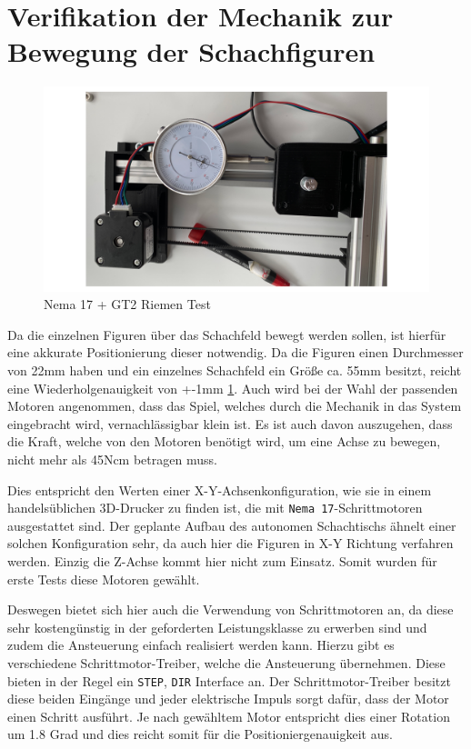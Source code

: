 \hypertarget{verifikation-der-mechanik-zur-bewegung-der-schachfiguren}{%
\section{Verifikation der Mechanik zur Bewegung der
Schachfiguren}\label{verifikation-der-mechanik-zur-bewegung-der-schachfiguren}}

\begin{figure}
\centering
\includegraphics{images/nema17_accuary_test.png}
\caption{Nema 17 + GT2 Riemen Test \label{nema17_accuary_test}}
\end{figure}

Da die einzelnen Figuren über das Schachfeld bewegt werden sollen, ist
hierfür eine akkurate Positionierung dieser notwendig. Da die Figuren
einen Durchmesser von 22mm haben und ein einzelnes Schachfeld ein Größe
ca. 55mm besitzt, reicht eine Wiederholgenauigkeit von +-1mm
\ref{nema17_accuary_test}. Auch wird bei der Wahl der passenden Motoren
angenommen, dass das Spiel, welches durch die Mechanik in das System
eingebracht wird, vernachlässigbar klein ist. Es ist auch davon
auszugehen, dass die Kraft, welche von den Motoren benötigt wird, um
eine Achse zu bewegen, nicht mehr als 45Ncm betragen muss.

Dies entspricht den Werten einer X-Y-Achsenkonfiguration, wie sie in
einem handelsüblichen 3D-Drucker zu finden ist, die mit
\passthrough{\lstinline!Nema 17!}-Schrittmotoren ausgestattet sind. Der
geplante Aufbau des autonomen Schachtischs ähnelt einer solchen
Konfiguration sehr, da auch hier die Figuren in X-Y Richtung verfahren
werden. Einzig die Z-Achse kommt hier nicht zum Einsatz. Somit wurden
für erste Tests diese Motoren gewählt.

Deswegen bietet sich hier auch die Verwendung von Schrittmotoren an, da
diese sehr kostengünstig in der geforderten Leistungsklasse zu erwerben
sind und zudem die Ansteuerung einfach realisiert werden kann. Hierzu
gibt es verschiedene Schrittmotor-Treiber, welche die Ansteuerung
übernehmen. Diese bieten in der Regel ein
\passthrough{\lstinline!STEP!}, \passthrough{\lstinline!DIR!} Interface
an. Der Schrittmotor-Treiber besitzt diese beiden Eingänge und jeder
elektrische Impuls sorgt dafür, dass der Motor einen Schritt ausführt.
Je nach gewähltem Motor entspricht dies einer Rotation um 1.8 Grad und
dies reicht somit für die Positioniergenauigkeit aus.

